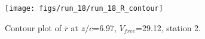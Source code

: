 \begin{figure}[H]
\centering
\texttt{[image: figs/run\_18/run\_18\_R\_contour]}
\caption{Contour plot of $\overline{r}$ at $z/c$=6.97, $V_{free}$=29.12, station 2.}
\label{fig:run_18_R_contour}
\end{figure}


